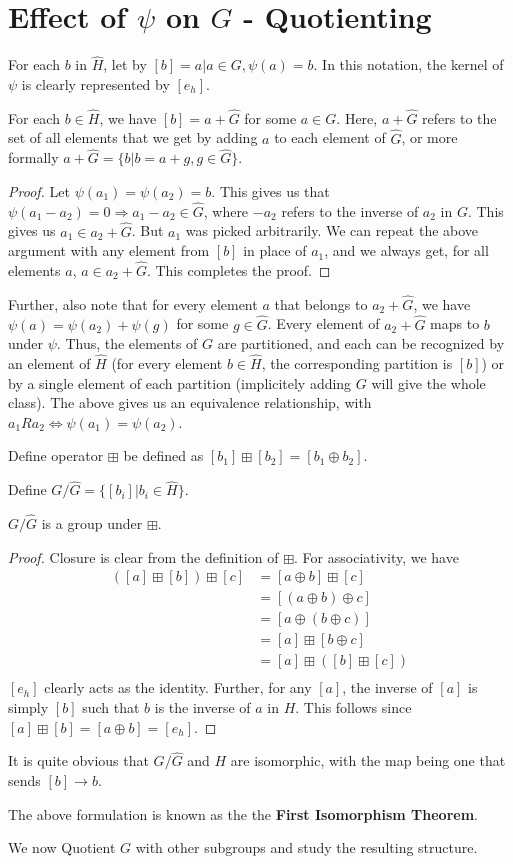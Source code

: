 \section{Effect of $\psi$ on $G$ - Quotienting}
For each $b$ in $\widehat{H}$, let by $[b] = {a|a \in G, \psi(a) = b}$.
In this notation, the kernel of $\psi$ is clearly represented by $[e_{h}]$.
\begin{lemma} \label{lem:partition}
  For each $b \in \widehat{H}$, we have $[b] = a + \widehat{G}$ for some $a \in G$.
  Here, $a + \widehat{G}$ refers to the set of all elements that we get by adding $a$ to each element of $\widehat{G}$, or more formally $a + \widehat{G} = \{b|b=a+g, g \in \widehat{G} \}$.
\end{lemma}
\begin{proof}
  Let $\psi(a_{1}) = \psi(a_{2}) = b$.
  This gives us that $\psi(a_{1} - a_{2}) = 0 \Rightarrow a_{1} - a_{2} \in \widehat{G}$, where $-a_{2}$ refers to the inverse of $a_{2}$ in $G$.
  This gives us $a_{1} \in a_{2} + \widehat{G}$.
  But $a_{1}$ was picked arbitrarily.
  We can repeat the above argument with any element from $[b]$ in place of $a_{1}$, and we always get, for all elements $a$, $a \in a_{2} + \widehat{G}$.
  This completes the proof.
\end{proof}
Further, also note that for every element $a$ that belongs to $a_{2} + \widehat{G}$, we have $\psi(a) = \psi(a_{2}) + \psi(g)$ for some $g \in \widehat{G}$.
Every element of $a_{2} + \widehat{G}$ maps to $b$ under $\psi$.
Thus, the elements of $G$ are partitioned, and each can be recognized by an element of $\widehat{H}$ (for every element $b \in \widehat{H}$, the corresponding partition is $[b]$) or by a single element of each partition (implicitely adding $G$ will give the whole class).
The above gives us an equivalence relationship, with $a_{1} R a_{2} \Leftrightarrow \psi(a_{1}) = \psi(a_{2})$.
\par
Define operator $\boxplus$ be defined as $[b_{1}] \boxplus [b_{2}] = [b_{1} \oplus b_{2}]$.
\par
Define $G \Big/ \widehat{G} = \{ [b_{i}] | b_{i} \in \widehat{H} \}$.
\begin{lemma} \label{lem:quotientgroup}
  $G \Big/ \widehat{G}$ is a group under $\boxplus$.
\end{lemma}
\begin{proof}
  Closure is clear from the definition of $\boxplus$.
  For associativity, we have
  \begin{align*}
    ([a] \boxplus [b]) \boxplus[c] &= [a \oplus b] \boxplus [c] \\
    &= [(a \oplus b) \oplus c] \\
    &= [a \oplus (b \oplus c)] \\
    &= [a] \boxplus [b \oplus c] \\
    &= [a] \boxplus ([b] \boxplus [c]) \\
  \end{align*}
  $[e_{h}]$ clearly acts as the identity.
  Further, for any $[a]$, the inverse of $[a]$ is simply $[b]$ such that $b$ is the inverse of $a$ in $H$.
  This follows since $[a] \boxplus [b] = [a \oplus b] = [e_{h}]$.
\end{proof}
It is quite obvious that $G \big/ \widehat{G}$ and $H$ are isomorphic, with the map being one that sends $[b] \rightarrow b$.
\par
The above formulation is known as the the \textbf{First Isomorphism Theorem}.
\par
We now Quotient $G$ with other subgroups and study the resulting structure.
